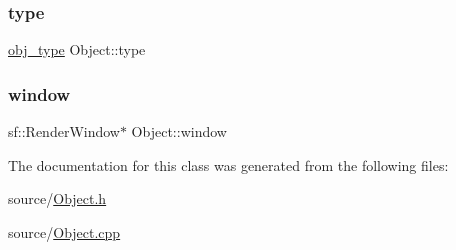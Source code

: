 \subsubsection{\texorpdfstring{type}{type}}
{\footnotesize\ttfamily \hyperlink{Object_8h_ac87c026b772bad1b7bb6edea6200fc92}{obj\+\_\+type} Object\+::type\hspace{0.3cm}{\ttfamily [protected]}}

\mbox{\label{classObject_a5c6cfc086ea1e39e0b3cf8633a763bf8}} 
\subsubsection{\texorpdfstring{window}{window}}
{\footnotesize\ttfamily sf\+::\+Render\+Window$\ast$ Object\+::window\hspace{0.3cm}{\ttfamily [protected]}}



The documentation for this class was generated from the following files\+:\begin{DoxyCompactItemize}
\item 
source/\hyperlink{Object_8h}{Object.\+h}\item 
source/\hyperlink{Object_8cpp}{Object.\+cpp}\end{DoxyCompactItemize}
